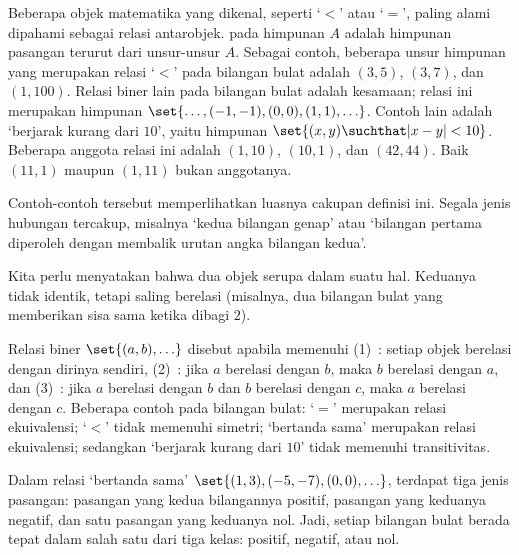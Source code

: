 Beberapa objek matematika yang dikenal, seperti `\( < \)' atau `\( = \)',
paling alami dipahami sebagai relasi antarobjek.
 pada himpunan \( A \) adalah himpunan pasangan
terurut dari unsur-unsur \( A \).
Sebagai contoh, beberapa unsur himpunan yang merupakan relasi `$<$' pada
bilangan bulat adalah \( (3,5) \), \( (3,7) \), dan \( (1,100) \).
Relasi biner lain pada bilangan bulat adalah kesamaan; relasi ini merupakan
himpunan \( \set{\ldots,(-1,-1),(0,0),(1,1),\ldots} \).
Contoh lain adalah `berjarak kurang dari \( 10 \)', yaitu himpunan
\( \set{(x,y)\suchthat |x-y|<10} \).
Beberapa anggota relasi ini adalah \( (1,10) \), \( (10,1) \), dan
\( (42,44) \). Baik \( (11,1) \) maupun \( (1,11) \) bukan anggotanya.

Contoh-contoh tersebut memperlihatkan luasnya cakupan definisi ini.
Segala jenis hubungan tercakup, misalnya `kedua bilangan genap' atau
`bilangan pertama diperoleh dengan membalik urutan angka bilangan kedua'.




Kita perlu menyatakan bahwa dua objek serupa dalam suatu hal.
Keduanya tidak identik, tetapi saling berelasi
(misalnya, dua bilangan bulat yang memberikan sisa sama ketika dibagi \( 2 \)).

Relasi biner \( \set{(a,b),\ldots} \) disebut
apabila memenuhi
(1)~:
     setiap objek berelasi dengan dirinya sendiri,
(2)~:
     jika \( a \) berelasi dengan \( b \), maka \( b \) berelasi dengan
     \( a \), dan
(3)~:
     jika \( a \) berelasi dengan \( b \) dan \( b \) berelasi dengan
     \( c \), maka \( a \) berelasi dengan \( c \).
Beberapa contoh pada bilangan bulat: `\( = \)' merupakan relasi ekuivalensi;
`\( < \)' tidak memenuhi simetri; `bertanda sama' merupakan relasi
ekuivalensi; sedangkan `berjarak kurang dari \( 10 \)' tidak memenuhi
transitivitas.






Dalam relasi `bertanda sama'
\( \set{(1,3),(-5,-7),(0,0),\ldots} \), terdapat tiga jenis pasangan:
pasangan yang kedua bilangannya positif, pasangan yang keduanya negatif,
dan satu pasangan yang keduanya nol.
Jadi, setiap bilangan bulat berada tepat dalam salah satu dari tiga kelas:
positif, negatif, atau nol.

